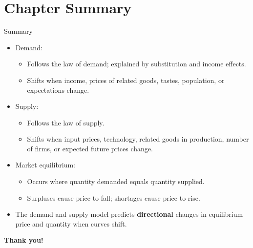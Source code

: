 \documentclass[aspectratio=169]{beamer}
\begin{document}
\section{Chapter Summary}

\begin{frame}{Summary}
\transfade
\begin{itemize}[<+->]
  \item Demand:
  \begin{itemize}[<+->]
    \item Follows the law of demand; explained by substitution and income effects.
    \item Shifts when income, prices of related goods, tastes, population, or expectations change.
  \end{itemize}
  \item Supply:
  \begin{itemize}[<+->]
    \item Follows the law of supply.
    \item Shifts when input prices, technology, related goods in production, number of firms, or expected future prices change.
  \end{itemize}
  \item Market equilibrium:
  \begin{itemize}[<+->]
    \item Occurs where quantity demanded equals quantity supplied.
    \item Surpluses cause price to fall; shortages cause price to rise.
  \end{itemize}
  \item The demand and supply model predicts \textbf{directional} changes in equilibrium price and quantity when curves shift.
\end{itemize}
\end{frame}

\begin{frame}
\centering
\Huge \textbf{Thank you!}
\end{frame}
\end{document}
